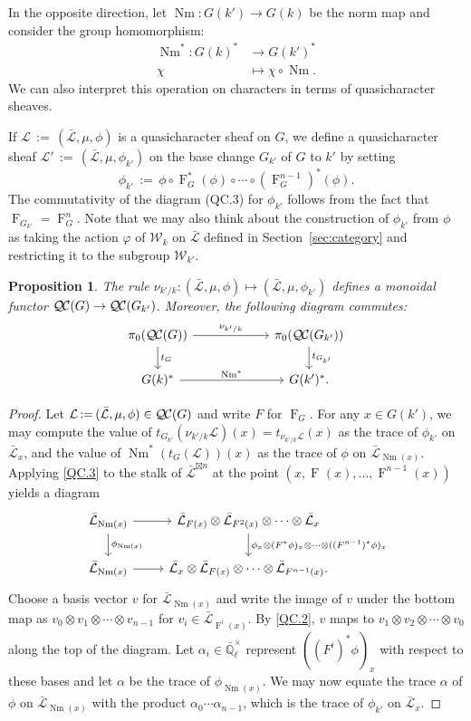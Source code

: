 \documentclass{amsart}
\theoremstyle{plain}
\newtheorem{proposition}[theorem]{Proposition}
\theoremstyle{definition}
\theoremstyle{remark}
\newcommand{\EE}{\mathbb{\bar Q}_\ell}
\newcommand{\EEx}{\EE^\times}
\newcommand{\Weil}[1]{\mathcal{W}_{#1}}
\newcommand{\Frob}[1]{\operatorname{F}_{#1}}
\DeclareMathOperator{\Nm}{Nm}
\newcommand{\ceq}{{\, :=\, }}
\newcommand{\qcs}[1]{{\mathcal{#1}}}
\newcommand{\gqcs}[1]{{\mathcal{\bar #1}}}
\newcommand{\QC}{{\mathcal{Q\hskip-0.8pt C}}}
\newcommand{\QCiso}[1]{\pi_0 (\QC(#1))}
\newcommand{\trFrob}[1]{t_{#1}}
\begin{document}
In the opposite direction, let $\Nm : G(k') \to G(k)$ be the norm map and consider the group homomorphism:
\begin{align*}
\Nm^* : G(k)^* &\to G(k')^* \\
\chi &\mapsto \chi\circ \Nm.
\end{align*}
We can also interpret this operation on characters in terms of quasicharacter sheaves.

If $\qcs{L} \ceq (\gqcs{L}, \mu, \phi)$ is a quasicharacter sheaf on $G$, we define
a quasicharacter sheaf $\qcs{L}' \ceq (\gqcs{L}, \mu, \phi_{k'})$ on the base change
$G_{k'}$ of $G$ to $k'$ by setting
\[
\phi_{k'} \ceq \phi \circ \Frob{G}^*(\phi) \circ \cdots \circ (\Frob{G}^{n-1})^*(\phi).
\]
The commutativity of the diagram (QC.3) for $\phi_{k'}$ 
follows from the fact that $\Frob{G_{k'}} = \Frob{G}^n$.
Note that we may also think about the construction of $\phi_{k'}$ from $\phi$
as taking the action $\varphi$ of $\Weil{k}$ on $\gqcs{L}$ 
defined in Section~\ref{sec:category} and restricting it to the subgroup $\Weil{k'}$.

\begin{proposition}\label{prop:basechange}
 The rule $\nu_{k'/k}: (\gqcs{L}, \mu, \phi) \mapsto (\gqcs{L}, \mu, \phi_{k'})$ 
 defines a monoidal functor $\QC(G) \to \QC(G_{k'})$. 
 Moreover, the following diagram commutes:
\[
\begin{tikzcd}[column sep=60]
\QCiso{G} \rar{\nu_{k'/k}} \dar{\trFrob{G}} & \QCiso{G_{k'}} \dar{\trFrob{G_{k'}}} \\
G(k)^*  \rar{\Nm^*} & G(k')^*.
\end{tikzcd}
\]
\end{proposition}
\begin{proof}
Let $\qcs{L} \ceq (\gqcs{L}, \mu, \phi) \in \QC(G)$ and write $F$ for $\Frob{G}$.  For any $x \in G(k')$,
we may compute the value of $t_{G_{k'}}(\nu_{k'/k}\qcs{L})(x)= t_{\nu_{k'/k}\qcs{L}}(x)$ as the trace of $\phi_{k'}$ on $\gqcs{L}_x$,
and the value of $\Nm^*(t_G(\qcs{L}))(x)$ as the trace of $\phi$ on $\gqcs{L}_{\Nm(x)}$.
Applying \ref{QC.3} to the stalk of $\gqcs{L}^{\boxtimes n}$ at the point $(x, \Frob{}(x), \ldots, \Frob{}^{n-1}(x))$ yields a diagram
\[
\begin{tikzcd}
\gqcs{L}_{\Nm(x)} \rar \dar{\phi_{\Nm(x)}} & \gqcs{L}_{F(x)} \otimes \gqcs{L}_{F^2(x)} \otimes \cdots \otimes \gqcs{L}_x
\dar{\phi_x \otimes (F^*\phi)_x \otimes \cdots \otimes ((F^{n-1})^*\phi)_x} \\
\gqcs{L}_{\Nm(x)} \rar & \gqcs{L}_x \otimes \gqcs{L}_{F(x)} \otimes \cdots \otimes \gqcs{L}_{F^{n-1}(x)}.
\end{tikzcd}
\]
Choose a basis vector $v$ for $\gqcs{L}_{\Nm(x)}$ and write the image of $v$ under the
bottom map as $v_0 \otimes v_1 \otimes \cdots \otimes v_{n-1}$
for $v_i \in \gqcs{L}_{\Frob{}^i(x)}$.  By \ref{QC.2}, $v$ maps to
$v_1 \otimes v_2 \otimes \cdots \otimes v_0$ along the top of the diagram.
Let $\alpha_i \in \EEx$ represent $((F^i)^*\phi)_x$ with respect to these bases and let $\alpha$ be
the trace of $\phi_{\Nm(x)}$.  We may now equate the trace $\alpha$ of $\phi$ on $\gqcs{L}_{\Nm(x)}$
with the product $\alpha_0 \cdots \alpha_{n-1}$, which is the trace of $\phi_{k'}$ on $\gqcs{L}_x$.
\end{proof}
\end{document}
